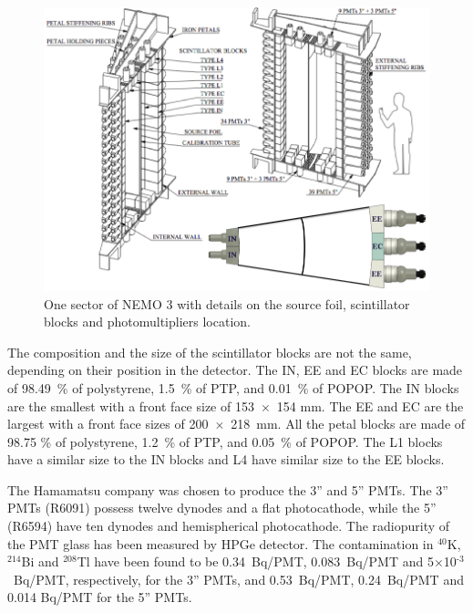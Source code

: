 \documentclass[main.tex]{subfiles}
\begin{document}
\begin{figure}[h!]
\begin{center}
\includegraphics[scale=0.34]{pictures/Chap3/SectorDetailedPMTconfig.png}
\caption{One sector of NEMO 3 with details on the source foil, scintillator blocks and photomultipliers location.}
\label{SectorDetailedPMTconfig}
\end{center}
\end{figure}


\NI The composition and the size of the scintillator blocks are not the same, depending on their position in the detector. The IN, EE and EC blocks are made of 98.49~\% of polystyrene, 1.5~\% of PTP, and 0.01~\% of POPOP. The IN blocks are the smallest with a front face size of 153~$\times$~154 mm. The EE and EC are the largest with a front face sizes of 200~$\times$~218~mm. All the petal blocks are made of 98.75 \% of polystyrene, 1.2~\% of PTP, and 0.05~\% of POPOP. The L1 blocks have a similar size to the IN blocks and L4 have similar size to the EE blocks. 


\bigskip


\NI The Hamamatsu company was chosen to produce the 3'' and 5'' PMTs. The 3'' PMTs (R6091) possess twelve dynodes and a flat photocathode, while the 5'' (R6594) have ten dynodes and hemispherical photocathode. The radiopurity of the PMT glass has been measured by HPGe detector. The contamination in $^{\text{40}}$K, $^{\text{214}}$Bi and $^{\text{208}}$Tl have been found to be 0.34~Bq/PMT, 0.083~Bq/PMT and 5$\times$10$^{\text{-3}}$~Bq/PMT, respectively, for the 3'' PMTs, and 0.53~Bq/PMT, 0.24~Bq/PMT and 0.014 Bq/PMT for the 5'' PMTs.
\end{document}
